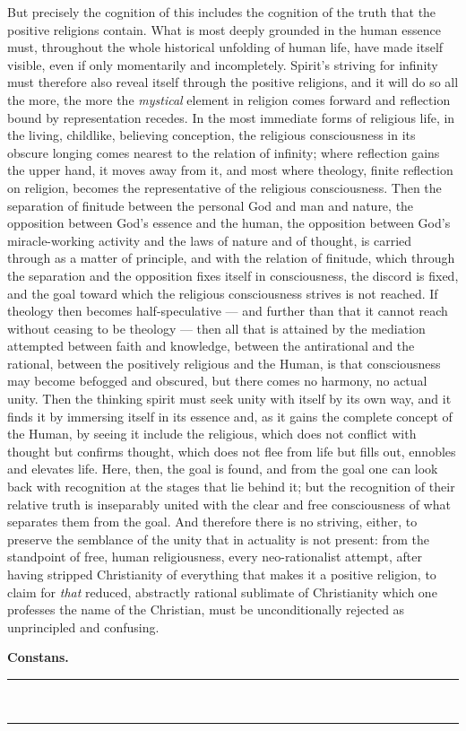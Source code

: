 \documentclass[12pt,a4paper,openany]{book}
\newcommand{\opage}[1]{\marginnote{\footnotesize\textit{[#1]}}}
\begin{document}
But precisely the cognition of this includes the cognition
of the truth that the positive religions contain. What is
most deeply grounded in the human essence must, throughout the whole
historical unfolding of human life, have made itself visible, even if
only momentarily and incompletely. Spirit's striving for infinity
must therefore also reveal itself through the positive
religions, and it will do so all the more, the more the
\emph{mystical} element in religion comes forward and reflection
bound by representation recedes. In the most immediate forms of religious
life, in the living, childlike, believing
conception, the religious consciousness in its obscure
longing comes nearest to the relation of infinity; where reflection gains
the upper hand, it moves away from it, and most where theology,
finite reflection on religion, becomes the representative
of the religious consciousness. Then the
\opage{510}separation of finitude between the personal God and man and
nature, the opposition between God's essence and the human,
the opposition between God's miracle-working activity
and the laws of nature and of thought, is carried through as a matter of principle,
and with the relation of finitude, which through the separation and
the opposition fixes itself in consciousness, the discord is fixed,
and the goal toward which the religious consciousness strives is
not reached. If theology then becomes half-speculative --- and
further than that it cannot reach without ceasing to be theology ---
then all that is attained by the mediation attempted between
faith and knowledge, between the antirational and the rational,
between the positively religious and the Human, is that consciousness
may become befogged and obscured, but there comes no
harmony, no actual unity. Then the thinking
spirit must seek unity with itself by its own way, and it
finds it by immersing itself in its essence and, as it
gains the complete concept of the Human, by seeing it include
the religious, which does not conflict with thought but confirms
thought, which does not flee from life but fills out, ennobles
and elevates life. Here, then, the goal is found, and from the goal
one can look back with recognition at the stages that lie
behind it; but the recognition of their relative truth
is inseparably united with the clear and free consciousness of
what separates them from the goal. And therefore there is
no striving, either, to preserve the semblance of the unity that in
actuality is not present: from the standpoint of free, human
religiousness, every neo-rationalist attempt,
after having stripped Christianity of everything that makes it
a positive religion, to claim for \emph{that} reduced, abstractly rational
sublimate of Christianity which one professes
the name of the Christian, must be unconditionally rejected as unprincipled and
confusing.

\begin{flushright}\textbf{Constans.}\end{flushright}
\begin{center}\rule{2.5cm}{0.4pt}\\[-10pt]\rule{2.5cm}{0.4pt}\end{center}
\end{document}
